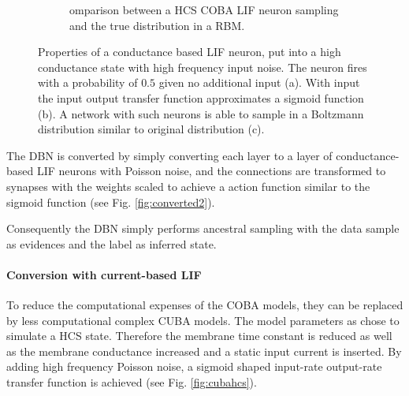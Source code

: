 \begin{figure}
\begin{subfigure}[t]{.5\textwidth}
  		\caption{omparison between a HCS COBA LIF neuron sampling and the true distribution in a RBM.}
  		\label{fig:cobahcs3}
	\end{subfigure}
	\caption{Properties of a conductance based LIF neuron, put into a high conductance state with high frequency input noise. The neuron fires with a probability of $0.5$ given no additional input (a). With input the input output transfer function approximates a sigmoid function (b). A network with such neurons is able to sample in a Boltzmann distribution similar to original distribution (c). }
	\label{fig:cobahcs}

\end{figure}
  
The DBN is converted by simply converting each layer to a layer of conductance-based LIF neurons with Poisson noise, and the connections are transformed to synapses with the weights scaled to achieve a action function similar to the sigmoid function (see Fig. \ref{fig:converted2}).

Consequently the DBN simply performs ancestral sampling with the data sample as evidences and the label as inferred state.   


\paragraph{Conversion with current-based LIF} \label{c:convascuba}

To reduce the computational expenses of the COBA models, they can be replaced by less computational complex CUBA models.
The model parameters as chose to simulate a HCS state.
Therefore the membrane time constant is reduced as well as the membrane conductance increased and a static input current is inserted.  
By adding high frequency Poisson noise, a sigmoid shaped input-rate output-rate transfer function is achieved (see Fig. \ref{fig:cubahcs}).

